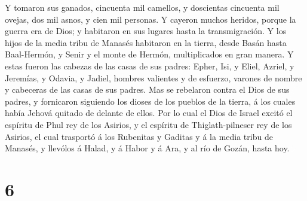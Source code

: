  Y tomaron sus ganados, cincuenta mil camellos, y
doscientas cincuenta mil ovejas, dos mil asnos, y cien mil personas.
 Y cayeron muchos heridos, porque la guerra era de Dios; y
habitaron en sus lugares hasta la transmigración.  Y los
hijos de la media tribu de Manasés habitaron en la tierra, desde Basán
hasta Baal-Hermón, y Senir y el monte de Hermón, multiplicados en gran
manera.  Y estas fueron las cabezas de las casas de sus
padres: Epher, Isi, y Eliel, Azriel, y Jeremías, y Odavia, y Jadiel,
hombres valientes y de esfuerzo, varones de nombre y cabeceras de las
casas de sus padres.  Mas se rebelaron contra el Dios de
sus padres, y fornicaron siguiendo los dioses de los pueblos de la
tierra, á los cuales había Jehová quitado de delante de ellos.
 Por lo cual el Dios de Israel excitó el espíritu de Phul
rey de los Asirios, y el espíritu de Thiglath-pilneser rey de los
Asirios, el cual trasportó á los Rubenitas y Gaditas y á la media tribu
de Manasés, y llevólos á Halad, y á Habor y á Ara, y al río de Gozán,
hasta hoy.

\hypertarget{section-5}{%
\section{6}\label{section-5}}

